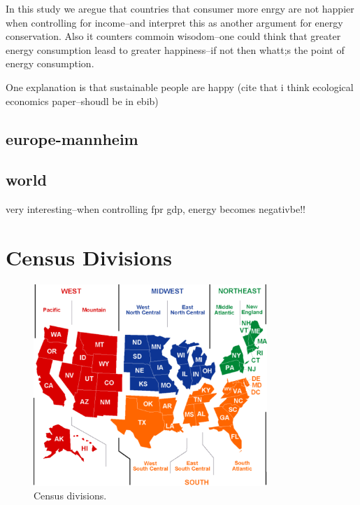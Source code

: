 \documentclass[10pt, letterpaper]{article}
\begin{document}
\begin{spacing}{1.4}
In this study we aregue that countries that consumer more enrgy are not happier
when controlling for income--and interpret this as another argument for energy
conservation. Also it counters commoin wisodom--one could think that greater
energy consumption leasd to greater happiness--if not then whatt;s the point of
energy consumption. 

One explanation is that sustainable people are happy (cite that i think
ecological economics paper--shoudl be in ebib)


\subsection{europe-mannheim}



\subsection{world}



very interesting--when controlling fpr gdp, energy becomes negativbe!!



\section{Census Divisions}

\begin{figure}[H]
 \includegraphics[height=3in]{graphsAndTables/cendivco.pdf}\centering
\caption{Census divisions.}\label{cenDiv}
\end{figure}


\end{spacing}
\end{document}
